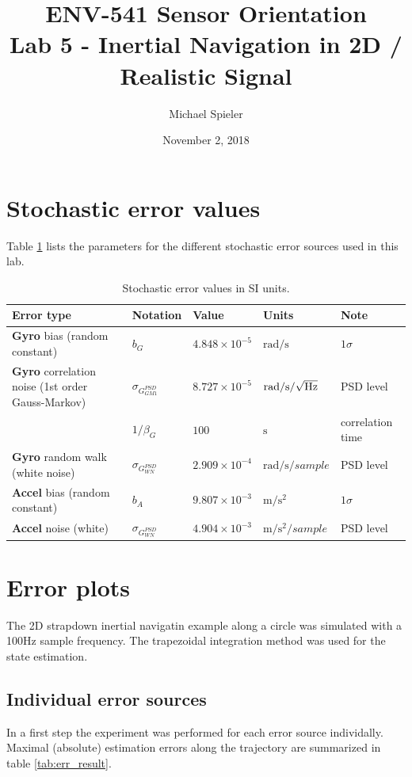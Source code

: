 \documentclass{article}
\title{ENV-541 Sensor Orientation\\Lab 5 - Inertial Navigation in 2D / Realistic Signal}
\author{Michael Spieler}
\date{November 2, 2018}
\newcommand{\e}[1]{\times 10^{#1}} %
\begin{document}
\maketitle

\section*{Stochastic error values}

Table \ref{tab:err_val} lists the parameters for the different stochastic error sources used in this lab.
\begin{table}[h]
\centering
\begin{tabular}{lllll}
Error type & Notation & Value & Units & Note \\
\hline
\textbf{Gyro} bias (random constant) & $b_G$ & $4.848\e{-5}$ & $\si{\radian/\second}$ & $1\sigma$ \\
\textbf{Gyro} correlation noise (1st order Gauss-Markov) & $\sigma_{G^{PSD}_{GM1}}$ & $8.727\e{-5}$ & $\si{\radian/\second/\sqrt{\hertz}}$ & PSD level \\
& $1/\beta_G$ & $100$ & $\si{\second}$ & correlation time \\
\textbf{Gyro} random walk (white noise) & $\sigma_{G^{PSD}_{WN}}$  & $2.909\e{-4}$ & $\si{\radian/\second/sample}$ & PSD level \\
\textbf{Accel} bias (random constant) & $b_A$  & $9.807 \e{-3}$ & $\si{\meter/\second^2}$ & $1\sigma$ \\
\textbf{Accel} noise (white)  & $\sigma_{G^{PSD}_{WN}}$ & $4.904\e{-3}$ & $\si{\meter/\second^2/sample}$ & PSD level
\end{tabular}
\caption{Stochastic error values in SI units.}
\label{tab:err_val}
\end{table}

\section*{Error plots}

The 2D strapdown inertial navigatin example along a circle was simulated with a 100Hz sample frequency.
The trapezoidal integration method was used for the state estimation.

\subsection*{Individual error sources}
In a first step the experiment was performed for each error source individally.
Maximal (absolute) estimation errors along the trajectory are summarized in table \ref{tab:err_result}.
\end{document}
